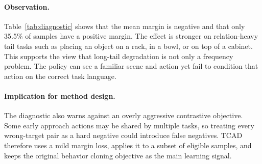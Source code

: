 \paragraph{Observation.}
Table~\ref{tab:diagnostic} shows that the mean margin is negative and that only 35.5\% of samples have a positive margin. The effect is stronger on relation-heavy tail tasks such as placing an object on a rack, in a bowl, or on top of a cabinet. This supports the view that long-tail degradation is not only a frequency problem. The policy can see a familiar scene and action yet fail to condition that action on the correct task language.

\paragraph{Implication for method design.}
The diagnostic also warns against an overly aggressive contrastive objective. Some early approach actions may be shared by multiple tasks, so treating every wrong-target pair as a hard negative could introduce false negatives. TCAD therefore uses a mild margin loss, applies it to a subset of eligible samples, and keeps the original behavior cloning objective as the main learning signal.
